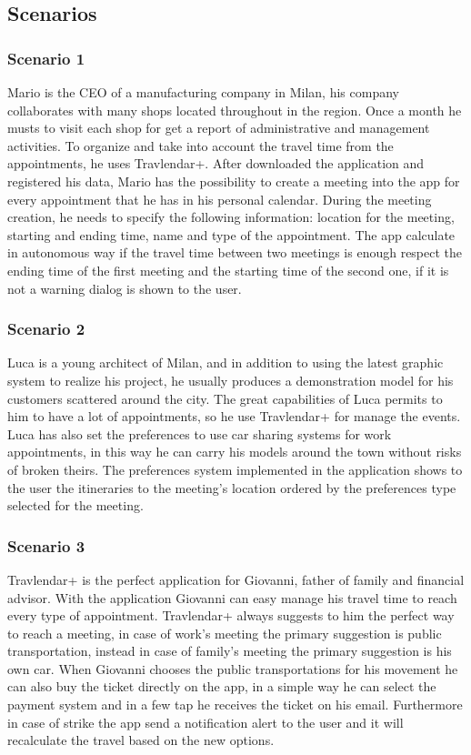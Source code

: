\subsection{Scenarios}
\subsubsection{Scenario 1}
Mario is the CEO of a manufacturing company in Milan, his company collaborates with many shops located throughout in the region. Once a month he musts to visit each shop for get a report of administrative and management activities. To organize and take into account the travel time from the appointments, he uses Travlendar+. After downloaded the application and registered his data, Mario has the possibility to create a meeting into the app for every appointment that he has in his personal calendar. During the meeting creation, he needs to specify the following information: location for the meeting, starting and ending time, name and type of the appointment. The app calculate in autonomous way if the travel time between two meetings is enough respect the ending time of the first meeting and the starting time of the second one, if it is not a warning dialog is shown to the user.

\subsubsection{Scenario 2}
Luca is a young architect of Milan, and in addition to using the latest graphic system to realize his project, he usually produces a demonstration model for his customers scattered around the city. The great capabilities of Luca permits to him to have a lot of appointments, so he use Travlendar+ for manage the events. Luca has also set the preferences to use car sharing systems for work appointments, in this way he can carry his models around the town without risks of broken theirs. The preferences system implemented in the application shows  to the user the itineraries to the meeting’s location ordered by the preferences type selected for the meeting.

\subsubsection{Scenario 3}
Travlendar+ is the perfect application for Giovanni, father of family and financial advisor.
With the application Giovanni can easy manage his travel time to reach every type of appointment. Travlendar+ always suggests to him the perfect way to reach a meeting, in case of work’s meeting the primary suggestion is public transportation, instead in case of family’s meeting the primary suggestion is his own car. When Giovanni chooses the public transportations for his movement he can also buy the ticket directly on the app, in a simple way he can select the payment system and in a few tap he receives the ticket on his email. Furthermore in case of strike the app send a notification alert to the user and it will recalculate the travel based on the new options.

